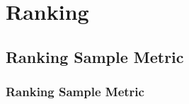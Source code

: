 \chapter{Ranking}


\clearpage
\thispagestyle{clusteringstyle}
\section{Ranking Sample Metric}
\subsection{Ranking Sample Metric}